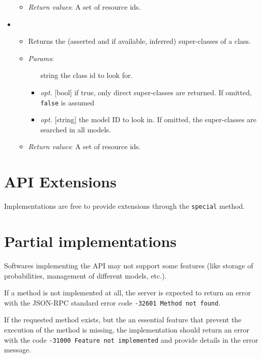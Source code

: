 \begin{itemize}
\begin{itemize}
\item  \emph{Return values}: A set of resource ids.
\end{itemize}

\item  {}
\begin{itemize}
\item  Returns the (asserted and if available, inferred) super-classes of a class.
\item  \emph{Params}:
\begin{itemize}
\item  [string] the class id to look for.
\item  \emph{opt.} [bool] if true, only direct super-classes are returned. If omitted, \texttt{false} is assumed 
\item  \emph{opt.} [string] the model ID to look in. If omitted, the super-classes are searched in all models. 
\end{itemize}

\item  \emph{Return values}: A set of resource ids.
\end{itemize}

\end{itemize}

\section{API Extensions}


Implementations are free to provide extensions through the \texttt{special} method.


\section{Partial implementations}


Softwares implementing the API may not support some features (like storage of probabilities, management of different models, etc.).

If a method is not implemented at all, the server is expected to return an error with the JSON-RPC standard error code \texttt{-32601 Method not found}.

If the requested method exists, but the an essential feature that prevent the execution of the method is missing, the implementation should return an error with the code \texttt{-31000 Feature not implemented} and provide details in the error message.

